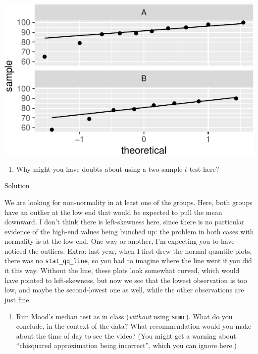 \documentclass[]{tufte-book}
\providecommand{\tightlist}{%
  \setlength{\itemsep}{0pt}\setlength{\parskip}{0pt}}
\theoremstyle{definition}
\theoremstyle{definition}
\theoremstyle{definition}
\theoremstyle{remark}
\begin{document}
\includegraphics{07-sign-mood-median_files/figure-latex/unnamed-chunk-74-1}

\begin{enumerate}
\def\labelenumi{(\alph{enumi})}
\setcounter{enumi}{2}
\tightlist
\item
  Why might you have doubts about using a two-sample \(t\)-test here?
\end{enumerate}

Solution

We are looking for non-normality in at least one of the groups. Here,
both groups have an outlier at the low end that would be expected to
pull the mean downward. I don't think there is left-skewness here, since
there is no particular evidence of the high-end values being bunched up:
the problem in both cases with normality is at the low end. One way or
another, I'm expecting you to have noticed the outliers. Extra: last
year, when I first drew the normal quantile plots, there was no
\texttt{stat\_qq\_line}, so you had to imagine where the line went if
you did it this way. Without the line, these plots look somewhat curved,
which would have pointed to left-skewness, but now we see that the
lowest observation is too low, and maybe the second-lowest one as well,
while the other observations are just fine.

\begin{enumerate}
\def\labelenumi{(\alph{enumi})}
\setcounter{enumi}{3}
\tightlist
\item
  Run Mood's median test as in class (\emph{without} using
  \texttt{smmr}). What do you conclude, in the context of the data? What
  recommendation would you make about the time of day to see the video?
  (You might get a warning about ``chisquared approximation being
  incorrect'', which you can ignore here.)
\end{enumerate}
\end{document}
